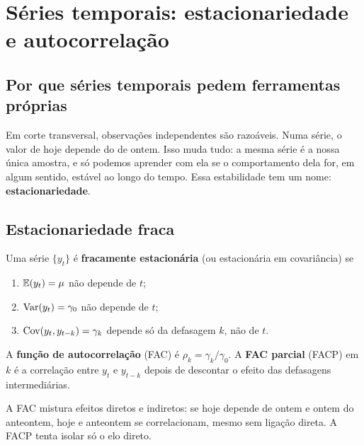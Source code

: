 \chapter{Séries temporais: estacionariedade e autocorrelação}
\label{cap:est}

\section{Por que séries temporais pedem ferramentas próprias}
Em corte transversal, observações independentes são razoáveis. Numa série, o valor de hoje depende do de ontem. Isso muda tudo: a mesma série é a nossa única amostra, e só podemos aprender com ela se o comportamento dela for, em algum sentido, estável ao longo do tempo. Essa estabilidade tem um nome: \textbf{estacionariedade}.

\section{Estacionariedade fraca}
Uma série $\{y_t\}$ é \textbf{fracamente estacionária} (ou estacionária em covariância) se
\begin{enumerate}[leftmargin=1.6em]
\item $\mathbb{E}(y_t)=\mu$ não depende de $t$;
\item $\operatorname{Var}(y_t)=\gamma_0$ não depende de $t$;
\item $\operatorname{Cov}(y_t,y_{t-k})=\gamma_k$ depende só da defasagem $k$, não de $t$.
\end{enumerate}
A \textbf{função de autocorrelação} (FAC) é $\rho_k=\gamma_k/\gamma_0$. A \textbf{FAC parcial} (FACP) em $k$ é a correlação entre $y_t$ e $y_{t-k}$ depois de descontar o efeito das defasagens intermediárias.

\begin{intuicao}
A FAC mistura efeitos diretos e indiretos: se hoje depende de ontem e ontem do anteontem, hoje e anteontem se correlacionam, mesmo sem ligação direta. A FACP tenta isolar só o elo direto.
\end{intuicao}

